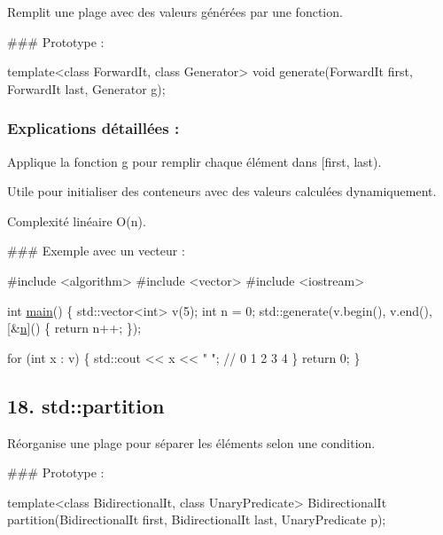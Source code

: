 Remplit une plage avec des valeurs générées par une fonction.

\#\#\# Prototype \+: 
\begin{DoxyCode}
\textcolor{keyword}{template}<\textcolor{keyword}{class} ForwardIt, \textcolor{keyword}{class} Generator>
\textcolor{keywordtype}{void} generate(ForwardIt first, ForwardIt last, Generator g);
\end{DoxyCode}


\subsubsection*{Explications détaillées \+:}


\begin{DoxyItemize}
\item Applique la fonction {\ttfamily g} pour remplir chaque élément dans {\ttfamily \mbox{[}first, last)}.
\item Utile pour initialiser des conteneurs avec des valeurs calculées dynamiquement.
\item Complexité linéaire O(n).
\end{DoxyItemize}

\#\#\# Exemple avec un vecteur \+: 
\begin{DoxyCode}
\textcolor{preprocessor}{#include <algorithm>}
\textcolor{preprocessor}{#include <vector>}
\textcolor{preprocessor}{#include <iostream>}

\textcolor{keywordtype}{int} \hyperlink{htop_8c_a3c04138a5bfe5d72780bb7e82a18e627}{main}() \{
    std::vector<int> v(5);
    \textcolor{keywordtype}{int} n = 0;
    std::generate(v.begin(), v.end(), [&\hyperlink{exo21_8cpp_a76f11d9a0a47b94f72c2d0e77fb32240}{n}]() \{ \textcolor{keywordflow}{return} n++; \});

    \textcolor{keywordflow}{for} (\textcolor{keywordtype}{int} x : v) \{
        std::cout << x << \textcolor{stringliteral}{" "}; \textcolor{comment}{// 0 1 2 3 4}
    \}
    \textcolor{keywordflow}{return} 0;
\}
\end{DoxyCode}
 



\subsection*{18. {\bfseries std\+::partition}}

Réorganise une plage pour séparer les éléments selon une condition.

\#\#\# Prototype \+: 
\begin{DoxyCode}
\textcolor{keyword}{template}<\textcolor{keyword}{class} B\textcolor{keywordtype}{id}irectionalIt, \textcolor{keyword}{class} UnaryPredicate>
BidirectionalIt partition(BidirectionalIt first, BidirectionalIt last, UnaryPredicate p);
\end{DoxyCode}


